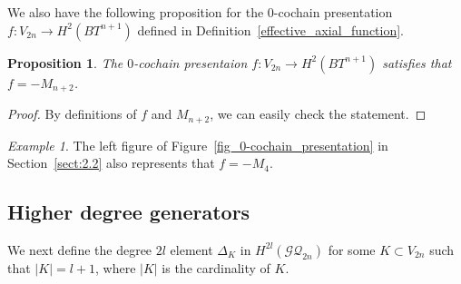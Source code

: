 \documentclass[12pt]{amsart}
\newtheorem{proposition}[theorem]{Proposition}
\theoremstyle{remark}
\newtheorem{example}{Example}[section]
\numberwithin{equation}{section}
\begin{document}
We also have the following proposition for the $0$-cochain presentation $f:V_{2n}\to H^{2}(BT^{n+1})$ defined in Definition~\ref{effective_axial_function}.
\begin{proposition}
\label{rel_M=-f}
The $0$-cochain presentaion $f:V_{2n}\to H^{2}(BT^{n+1})$ satisfies that 
$f=-M_{n+2}$.
\end{proposition}
\begin{proof}
By definitions of $f$ and $M_{n+2}$, we can easily check the statement. 
\end{proof}

\begin{example}
\label{using_ex_Fig3}
The left figure of Figure~\ref{fig_0-cochain_presentation} in Section~\ref{sect:2.2} also represents that $f=-M_{4}$. 
\end{example}

\subsection{Higher degree generators}
\label{sect:3.3}

We next define the degree $2l$ element $\Delta_{K}$ in $H^{2l}(\mathcal{GQ}_{2n})$ for some $K\subset V_{2n}$ such that $|K|=l+1$, where $|K|$ is the cardinality of $K$.
\end{document}

